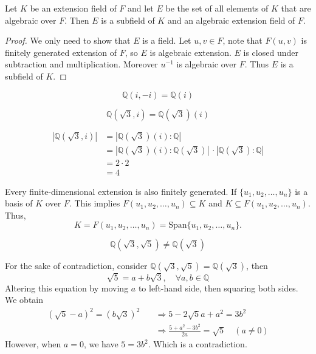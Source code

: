 \begin{corollary}
    Let $K$ be an extension field of $F$ and let $E$ be the set of all elements of $K$ that are 
    algebraic over $F$. Then $E$ is a subfield of $K$ and an algebraic extension field of $F$.
\end{corollary}
\begin{proof}
    We only need to show that $E$ is a field. Let $u,v \in F$, note that $F(u,v)$ 
    is finitely generated extension of $F$, so $E$ is algebraic extension.
    $E$ is closed under subtraction and multiplication. Moreover $u^{-1}$ is 
    algebraic over $F$. Thus $E$ is a subfield of $K$.
\end{proof}


\begin{example}
    \[
        \mathbb{Q}(i, -i) = \mathbb{Q}(i)
    \]
\end{example}

\begin{example}
    $$\mathbb{Q}(\sqrt{3}, i) = \mathbb{Q}(\sqrt{3})(i)$$
\end{example}
\begin{solution}
    \begin{align*}
        |\mathbb{Q}(\sqrt{3}, i)| &= |\mathbb{Q}(\sqrt{3})(i): \mathbb{Q}|\\
        &= |\mathbb{Q}(\sqrt{3})(i): \mathbb{Q}(\sqrt{3})| \, \cdot |\mathbb{Q}(\sqrt{3}): \mathbb{Q}|\\
        &= 2 \cdot 2\\
        &= 4
    \end{align*}
\end{solution}

\begin{example}
    Every finite-dimensional extension is also finitely generated. If $\{ u_1, u_2, \ldots, u_n \}$ 
    is a basis of $K$ over $F$. This implies $F(u_1, u_2, \ldots, u_n) \subseteq K$ and 
    $K \subseteq F(u_1, u_2, \ldots, u_n)$. 
    Thus,
    \[
        K = F(u_1, u_2, \ldots, u_n) = \text{Span}\{ u_1, u_2, \ldots, u_n \}.
    \]
\end{example}

\begin{example}
     $$\mathbb{Q}(\sqrt{3}, \sqrt{5}) \neq \mathbb{Q}(\sqrt{3})$$
\end{example}
\begin{solution}
    For the sake of contradiction, consider $\mathbb{Q}(\sqrt{3}, \sqrt{5}) = \mathbb{Q}(\sqrt{3})$, then 
    \[
        \sqrt{5} = a+ b\sqrt{3}, \quad \forall a,b \in \mathbb{Q}
    \]
    Altering this equation by moving $a$ to left-hand side, then squaring both sides. We obtain
    \begin{align*}
        (\sqrt{5} - a)^2 = (b\sqrt{3})^2 \quad &\Rightarrow 5 - 2\sqrt{5}a + a^2 = 3b^2\\
        &\Rightarrow \frac{5 + a^2 - 3b^2}{2a} = \sqrt{5} \quad (a\neq 0)
    \end{align*}
    However, when $a=0$, we have $5 = 3b^2$. Which is a contradiction.
\end{solution}

